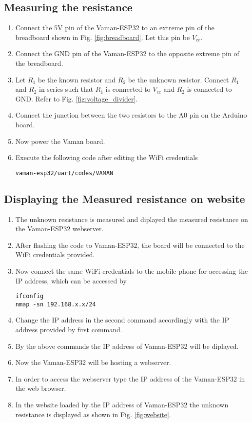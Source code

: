 \subsection{Measuring the resistance}
\begin{enumerate}[label=\thesection.\arabic*.,ref=\thesection.\theenumi]

\item
Connect the 5V pin of the Vaman-ESP32 to an extreme pin of the breadboard shown 
in Fig. \ref{fig:breadboard}. Let this pin be $V_{cc}$.
\item
Connect the GND pin of the Vaman-ESP32 to the opposite extreme pin of the 
breadboard.
\item
Let $R_1$ be the known resistor and $R_2$ be the unknown resistor. Connect $R_1$
and $R_2$ in series such that $R_1$ is connected to $V_{cc}$ and $R_2$ is 
connected to GND. Refer to Fig. \ref{fig:voltage_divider}.
\item
Connect the junction between the two resistors to  the A0 pin on the Arduino board.
\item
Now power the Vaman board.
\item
Execute the following code after editing the WiFi credentials
\begin{lstlisting}
vaman-esp32/uart/codes/VAMAN
\end{lstlisting}
\end{enumerate}
\subsection{Displaying the Measured resistance on website}
\begin{enumerate}[label=\thesection.\arabic*.,ref=\thesection.\theenumi]
\item The unknown resistance is measured and diplayed the measured resistance on
the Vaman-ESP32 webserver.
\item After flashing the code to Vaman-ESP32, the board will be connected to the
WiFi credentials provided.
\item Now connect the same WiFi credentials to the mobile phone for accessing 
the IP address, which can be accessed by 
\begin{lstlisting}
ifconfig
nmap -sn 192.168.x.x/24
\end{lstlisting}
\item Change the IP address in the second command accordingly with the IP address 
provided by first command.
\item By the above commands the IP address of Vaman-ESP32 will be diplayed.
\item Now the Vaman-ESP32 will be hosting a webserver.
\item In order to access the webserver type the IP address of the Vaman-ESP32 in
the web browser.
\item In the website loaded by the IP address of Vaman-ESP32 the unknown 
resistance is displayed as shown in Fig. \ref{fig:website}.
\end{enumerate}
